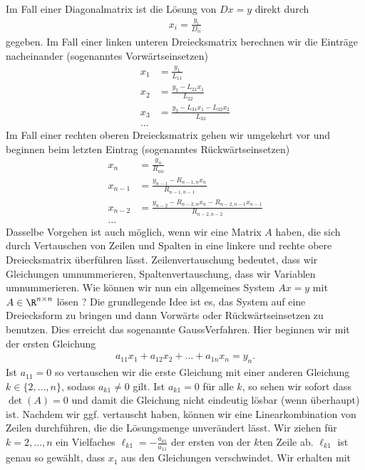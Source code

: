 \documentclass[letterpaper,10pt,english]{jupyterBook}
\begin{document}
Im Fall einer Diagonalmatrix ist die Lösung von \(Dx = y\) direkt durch
\begin{equation*}
\begin{split} x_i = \frac{y_i}{D_{ii}}\end{split}
\end{equation*}
gegeben. Im Fall einer linken unteren Dreiecksmatrix berechnen wir die Einträge nacheinander (sogenanntes Vorwärtseinsetzen)
\begin{align*}
x_1 &= \frac{y_1}{L_{11}} \\
x_2 &= \frac{y_2-L_{21} x_1}{L_{22}} \\
x_3 &= \frac{y_3-L_{31} x_1-L_{32} x_2}{L_{33}} \\
\ldots
\end{align*}
Im Fall einer rechten oberen Dreiecksmatrix gehen wir umgekehrt vor und beginnen beim letzten Eintrag (sogenanntes Rückwärtseinsetzen)
\begin{align*}
x_n &= \frac{y_n}{R_{nn}} \\
x_{n-1} &= \frac{y_{n-1}-R_{n-1,n} x_n}{R_{n-1,n-1}} \\
x_{n-2} &= \frac{y_{n-2}-R_{n-2,n} x_n-R_{n-2,n-1} x_{n-1}}{R_{n-2,n-2}} \\
\ldots
\end{align*}
Dasselbe Vorgehen ist auch möglich, wenn wir eine Matrix \(A\) haben, die sich durch Vertauschen von Zeilen und Spalten in eine linkere und rechte obere Dreiecksmatrix überführen lässt. Zeilenvertauschung bedeutet, dass wir Gleichungen umnummerieren, Spaltenvertauschung, dass wir Variablen umnummerieren.
Wie können wir nun ein allgemeines System \(Ax = y\) mit \(A \in \R^{n \times n}\) lösen ? Die grundlegende Idee ist es, das System auf eine Dreiecksform zu bringen und dann Vorwärts\sphinxhyphen{} oder Rückwärtseinsetzen zu benutzen. Dies erreicht das sogenannte Gauss\sphinxhyphen{}Verfahren. Hier beginnen wir mit der ersten Gleichung
\begin{equation*}
\begin{split} a_{11}x_1 + a_{12} x_2 + \ldots + a_{1n} x_n = y_n.\end{split}
\end{equation*}
Ist \(a_{11}=0\) so vertauschen wir die erste Gleichung mit einer anderen Gleichung \(k \in \{2,\ldots,n\}\), sodass \(a_{k1} \neq 0\) gilt. Ist \(a_{k1}=0\) für alle \(k\), so sehen wir sofort dass \(\det(A)=0\) und damit die Gleichung nicht eindeutig lösbar (wenn überhaupt) ist.  Nachdem wir ggf. vertauscht haben, können wir eine Linearkombination von Zeilen durchführen, die die Lösungsmenge unverändert lässt. Wir ziehen für \(k=2,\ldots,n\) ein Vielfaches \(\ell_{k1} = - \frac{a_{k1}}{a_{11}}\) der ersten von der \(k\)\sphinxhyphen{}ten Zeile ab. \(\ell_{k1}\) ist genau so gewählt, dass \(x_1\) aus den Gleichungen verschwindet. Wir erhalten mit
\end{document}
